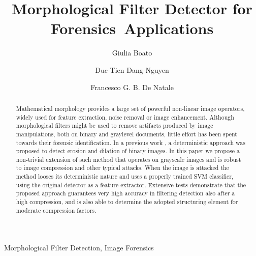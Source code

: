 \documentclass[review]{elsarticle}
\begin{document}
\begin{frontmatter}

\title{Morphological Filter Detector for Forensics~Applications}

\author{Giulia Boato}
\address{University of Trento, Italy}


\author{Duc-Tien Dang-Nguyen}
\address{University of Bergen, Norway}

\author{Francesco G. B. De Natale}
\address{University of Trento, Italy}





\begin{abstract}
Mathematical morphology provides a large set of powerful non-linear image operators, widely used for feature extraction, noise removal or image enhancement. Although morphological filters might be used to remove artifacts produced by image manipulations, both on binary and graylevel documents, little effort has been spent towards their forensic identification. In a previous work \cite{de2017detecting}, a deterministic approach was proposed to detect erosion and dilation of binary images. In this paper we propose a non-trivial extension of such method that operates on grayscale images and is robust to image compression and other typical attacks. When the image is attacked the method looses its deterministic nature and uses a properly trained SVM classifier, using the original detector as a feature extractor. Extensive tests demonstrate that the proposed approach guarantees very high accuracy in filtering detection also after a high compression, and is also able to determine the adopted structuring element for moderate compression factors.
\end{abstract}

\begin{keyword}
Morphological Filter Detection, Image Forensics 
\end{keyword}

\end{frontmatter}
\end{document}
